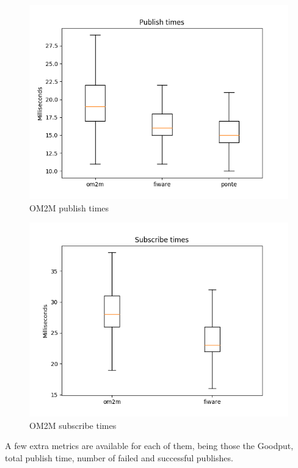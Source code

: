 \documentclass[conference]{IEEEtran}
\begin{document}
\begin{figure}[htbp!]
  \centering
  \includegraphics[width=\columnwidth]{figures/om2m_fiware_ponte_publish_times.png}
  \caption{OM2M publish times}
  \label{fig:publish_times}
\end{figure}

\begin{figure}[htbp!]
  \centering
  \includegraphics[width=\columnwidth]{figures/om2m_fiware_subscribe_times.png}
  \caption{OM2M subscribe times}
  \label{fig:subscribe_times}
\end{figure}

A few extra metrics are available for each of them, being those the Goodput, total publish time, number of failed and successful publishes.
\end{document}
